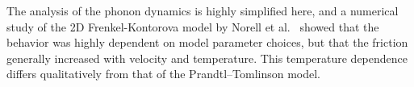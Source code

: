 The analysis of the phonon dynamics is highly simplified here, and a numerical study of the 2D Frenkel-Kontorova model by Norell et al.~\cite{FK2D} showed that the behavior was highly dependent on model parameter choices, but that the friction generally increased with velocity and temperature. This temperature dependence differs qualitatively from that of the Prandtl–Tomlinson model.























